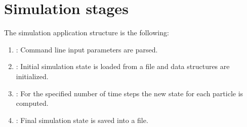 \section{Simulation stages}

The simulation application structure is the following:

\begin{enumerate}
  \item {}: Command line input parameters are parsed.
  \item {}: Initial simulation state is 
        loaded from a file and data structures are initialized.
  \item {}: For the specified number of time 
        steps the new state for each particle is computed.
  \item {}: Final simulation state is saved into a file.
\end{enumerate}






